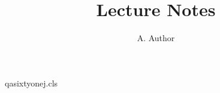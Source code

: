 \begin{filecontents*}[overwrite]{qasixtyonej.cls}
\def\@PACS{}
\def\PACS#1{\gdef\@PACS{#1}}
\def\articlename{x}
\def\@sodtitle{Lecture Notes}
\renewcommand\maketitle{\par\begingroup\@maketitle\endgroup
  \addtocontents{sod}{\string\def\string\art\articlename{\@sodtitle}}%
  \addtocontents{sod}{\string\def\string\pacs\articlename{\@PACS}}}
\def\@maketitle{\vbox{\begin{center}{\Large\@title\par}\@author\par\end{center}
  \small\noindent PACS: \@PACS\\[2mm]}}
\end{filecontents*}
\documentclass{qasixtyonej}
\title{Lecture Notes}
\author{A. Author}

\maketitle
Text.

